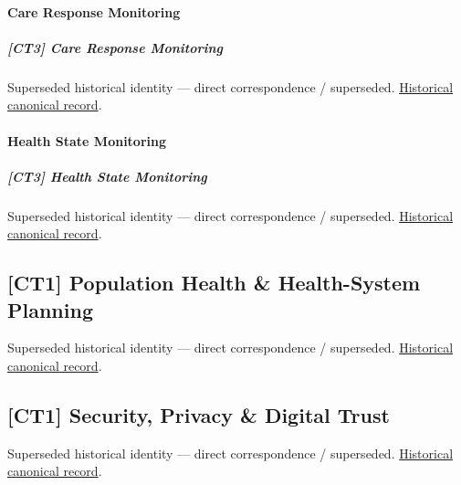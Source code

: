 \paragraph{Care Response Monitoring}

\subparagraph{[CT3] Care Response Monitoring}

\par\label{element:615f93d05fbb4a8481f07778bd4f4803}
Superseded historical identity — direct correspondence / superseded. \href{../../../../continuum/strategy/capability/615f93d05fbb4a8481f07778bd4f4803.md}{Historical canonical record}.\par

\paragraph{Health State Monitoring}

\subparagraph{[CT3] Health State Monitoring}

\par\label{element:346f024f74b447a8b6056b9d521837ff}
Superseded historical identity — direct correspondence / superseded. \href{../../../../continuum/strategy/capability/346f024f74b447a8b6056b9d521837ff.md}{Historical canonical record}.\par

\subsection{[CT1] Population Health \& Health-System Planning}

\par\label{element:a5003436a7f348b1bff60ba593adfa27}
Superseded historical identity — direct correspondence / superseded. \href{../../../../continuum/strategy/capability/a5003436a7f348b1bff60ba593adfa27.md}{Historical canonical record}.\par

\subsection{[CT1] Security, Privacy \& Digital Trust}

\par\label{element:b01441b2f5584fc2b9c3988643a7c93b}
Superseded historical identity — direct correspondence / superseded. \href{../../../../continuum/strategy/capability/b01441b2f5584fc2b9c3988643a7c93b.md}{Historical canonical record}.\par

